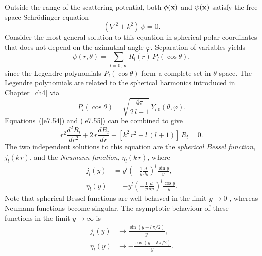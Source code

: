 Outside the range of the scattering potential, both $\phi({\bf x})$ and
$\psi({\bf x})$ satisfy the free space Schr\"{o}dinger equation 
\begin{equation}\label{e7.54}
(\nabla^2 + k^2)\,\psi = 0.
\end{equation}
Consider the most general solution to this equation in spherical polar
coordinates that does not depend on the azimuthal angle $\varphi$.
Separation of variables yields
\begin{equation}\label{e7.55}
\psi(r,\theta) = \sum_{l=0,\infty} R_l(r)\, P_l(\cos\theta),
\end{equation}
since the Legendre polynomials $P_l(\cos\theta)$ form a complete
set in $\theta$-space. The Legendre polynomials are related to the
spherical harmonics  introduced in Chapter~\ref{ch4} via
\begin{equation}
P_l(\cos\theta) = \sqrt{\frac{4\pi}{2\,l+1}}\, Y_{l\,0}(\theta,\varphi).
\end{equation}
Equations~(\ref{e7.54}) and (\ref{e7.55}) can be combined to give
\begin{equation}
r^2\frac{d^2 R_l}{dr^2} + 2\,r \frac{dR_l}{dr} +  [k^2 \,r^2 -
l\,(l+1)]\,R_l = 0.
\end{equation}
The two independent solutions to this equation are the 
{\em spherical Bessel function}, $j_l(k\,r)$, and the  {\em Neumann function},
$\eta_l(k\,r)$, 
where 
\begin{align}\label{e7.58a}
j_l(y) &= y^l\left(-\frac{1}{y}\frac{d}{dy}\right)^l \frac{\sin y}{y},
\\[0.5ex]\label{e7.58b}
\eta_l(y) &= -y^l\left(-\frac{1}{y}\frac{d}{dy}\right)^l \frac{\cos y}{y}.
\end{align}
Note that  spherical Bessel functions are well-behaved in the limit
$y\rightarrow 0$ , whereas  Neumann functions become singular.
The asymptotic behaviour of these functions in the limit $y\rightarrow
\infty$ is
\begin{align}\label{e7.59a}
j_l(y) &\rightarrow \frac{\sin(y - l\,\pi/2)}{y},\\[0.5ex]
\eta_l(y) &\rightarrow  - \frac{\cos(y-l\,\pi/2)}{y}.\label{e7.59b}
\end{align}

